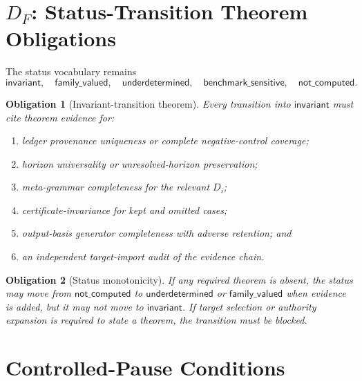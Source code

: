 \documentclass[11pt]{article}
\newtheorem{obligation}{Obligation}
\begin{document}
\section{\texorpdfstring{\(D_F\)}{DF}: Status-Transition Theorem Obligations}

The status vocabulary remains
\[
\mathsf{invariant},\quad
\mathsf{family\_valued},\quad
\mathsf{underdetermined},\quad
\mathsf{benchmark\_sensitive},\quad
\mathsf{not\_computed}.
\]

\begin{obligation}[Invariant-transition theorem]
Every transition into \(\mathsf{invariant}\) must cite theorem evidence for:
\begin{enumerate}
    \item ledger provenance uniqueness or complete negative-control coverage;
    \item horizon universality or unresolved-horizon preservation;
    \item meta-grammar completeness for the relevant \(D_i\);
    \item certificate-invariance for kept and omitted cases;
    \item output-basis generator completeness with adverse retention; and
    \item an independent target-import audit of the evidence chain.
\end{enumerate}
\end{obligation}

\begin{obligation}[Status monotonicity]
If any required theorem is absent, the status may move from
\(\mathsf{not\_computed}\) to \(\mathsf{underdetermined}\) or
\(\mathsf{family\_valued}\) when evidence is added, but it may not move to
\(\mathsf{invariant}\). If target selection or authority expansion is
required to state a theorem, the transition must be blocked.
\end{obligation}

\section{Controlled-Pause Conditions}
\end{document}
